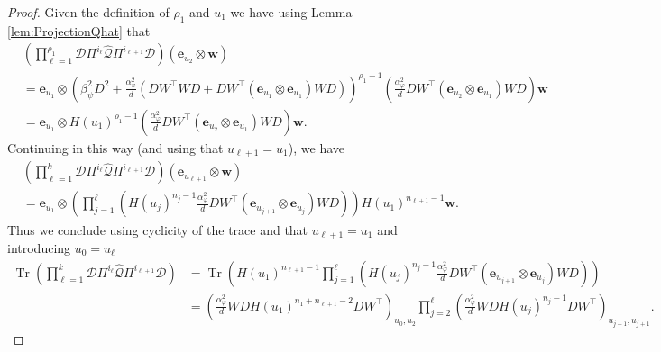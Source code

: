\documentclass[letterpaper, 10pt, dvipsnames]{article}
\numberwithin{equation}{section}
\DeclareMathOperator{\Tr}{Tr}
\newcommand{\D}{\mathcal{D}}
\newcommand{\Q}{\mathcal{Q}}
\newcommand{\ebf}{\mathbf{e}}
\newcommand{\w}{\mathbf{w}}
\renewcommand{\phi}{\varphi}
\theoremstyle{definition}
\begin{document}
\begin{proof}
  Given the definition of $\rho_1$ and $u_1$ we have using Lemma \ref{lem:ProjectionQhat} that 
  \[
  \begin{aligned}
    &\left( \prod_{\ell=1}^{\rho_1} \D \Pi^{i_{\ell}}\widehat{\Q}\Pi^{i_{\ell+1}}\D \right) ( \ebf_{u_2}\otimes \w) \\
    &=
    \ebf_{u_1} \otimes 
    \left(
      \beta_\psi^2D^2 + \frac{\alpha_\phi^2}{d}\left(
        DW^\top WD  + DW^\top (\ebf_{u_1} \otimes \ebf_{u_1}) WD 
      \right)
    \right)^{\rho_1 - 1} \left(
      \frac{\alpha_\phi^2}{d}
      DW^\top (\ebf_{u_2} \otimes \ebf_{u_1}) WD 
    \right)\w \\
    &=
    \ebf_{u_1} \otimes 
      H(u_1)^{\rho_1 - 1} 
  \left(
      \frac{\alpha_\phi^2}{d}
      DW^\top (\ebf_{u_2} \otimes \ebf_{u_1}) WD 
    \right)\w.
    \end{aligned}
  \]
  Continuing in this way (and using that $u_{\ell+1}=u_1$), we have 
  \[
    \begin{aligned}
    &\left( \prod_{\ell=1}^k \D \Pi^{i_\ell}\widehat{\Q}\Pi^{i_{\ell+1}}\D \right) ( \ebf_{u_{\ell+1}}\otimes \w) \\
    &=
    \ebf_{u_1}
    \otimes
    \left(
    \prod_{j=1}^{\ell} 
    \left(
       H(u_j)^{n_j-1}
      \frac{\alpha_\phi^2}{d}
      DW^\top (\ebf_{u_{j+1}} \otimes \ebf_{u_{j}}) WD 
    \right)
    \right)
    H(u_1)^{n_{\ell+1}-1}
    \w.
   \end{aligned}
  \]
  Thus we conclude using cyclicity of the trace and that $u_{\ell+1}=u_1$ and introducing $u_{0}=u_{\ell}$
  \[
    \begin{aligned}
      \Tr \left( \prod_{\ell=1}^k \D \Pi^{i_\ell}\widehat{\Q}\Pi^{i_{\ell+1}}\D \right)
      &=
      \Tr\left(
        H(u_1)^{n_{\ell+1}-1}
        \prod_{j=1}^{\ell} 
        \left(
       H(u_j)^{n_j-1}
      \frac{\alpha_\phi^2}{d}
      DW^\top (\ebf_{u_{j+1}} \otimes \ebf_{u_{j}}) WD 
    \right)
    \right) \\
    &=  
    \left(       \frac{\alpha_\phi^2}{d}
    W D H(u_1)^{n_1+n_{\ell+1}-2} DW^\top \right)_{u_0, u_2}
    \prod_{j=2}^{\ell}
    \left(       \frac{\alpha_\phi^2}{d}
    W D H(u_j)^{n_j-1} DW^\top \right)_{u_{j-1}, u_{j+1}}.
    \end{aligned}
  \]
\end{proof}
\end{document}
